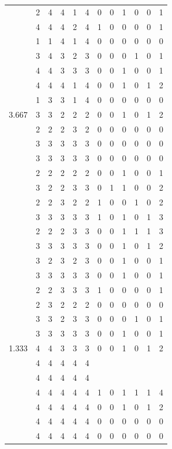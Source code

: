 \documentclass[]{msu-thesis}
\theoremstyle{definition}
\theoremstyle{definition}
\theoremstyle{definition}
\theoremstyle{remark}
\begin{document}
\begin{table}
{\begin{tabular}[t]{rrrrrrrrrrrr}
 & 2 & 4 & 4 & 1 & 4 & 0 & 0 & 1 & 0 & 0 & 1\\
 & 4 & 4 & 4 & 2 & 4 & 1 & 0 & 0 & 0 & 0 & 1\\
 & 1 & 1 & 4 & 1 & 4 & 0 & 0 & 0 & 0 & 0 & 0\\
 & 3 & 4 & 3 & 2 & 3 & 0 & 0 & 0 & 1 & 0 & 1\\
 & 4 & 4 & 3 & 3 & 3 & 0 & 0 & 1 & 0 & 0 & 1\\
 & 4 & 4 & 4 & 1 & 4 & 0 & 0 & 1 & 0 & 1 & 2\\
 & 1 & 3 & 3 & 1 & 4 & 0 & 0 & 0 & 0 & 0 & 0\\
3.667 & 3 & 3 & 2 & 2 & 2 & 0 & 0 & 1 & 0 & 1 & 2\\
 & 2 & 2 & 2 & 3 & 2 & 0 & 0 & 0 & 0 & 0 & 0\\
 & 3 & 3 & 3 & 3 & 3 & 0 & 0 & 0 & 0 & 0 & 0\\
 & 3 & 3 & 3 & 3 & 3 & 0 & 0 & 0 & 0 & 0 & 0\\
 & 2 & 2 & 2 & 2 & 2 & 0 & 0 & 1 & 0 & 0 & 1\\
 & 3 & 2 & 2 & 3 & 3 & 0 & 1 & 1 & 0 & 0 & 2\\
 & 2 & 2 & 3 & 2 & 2 & 1 & 0 & 0 & 1 & 0 & 2\\
 & 3 & 3 & 3 & 3 & 3 & 1 & 0 & 1 & 0 & 1 & 3\\
 & 2 & 2 & 2 & 3 & 3 & 0 & 0 & 1 & 1 & 1 & 3\\
 & 3 & 3 & 3 & 3 & 3 & 0 & 0 & 1 & 0 & 1 & 2\\
 & 3 & 2 & 3 & 2 & 3 & 0 & 0 & 1 & 0 & 0 & 1\\
 & 3 & 3 & 3 & 3 & 3 & 0 & 0 & 1 & 0 & 0 & 1\\
 & 2 & 2 & 3 & 3 & 3 & 1 & 0 & 0 & 0 & 0 & 1\\
 & 2 & 3 & 2 & 2 & 2 & 0 & 0 & 0 & 0 & 0 & 0\\
 & 3 & 3 & 2 & 3 & 3 & 0 & 0 & 0 & 1 & 0 & 1\\
 & 3 & 3 & 3 & 3 & 3 & 0 & 0 & 1 & 0 & 0 & 1\\
1.333 & 4 & 4 & 3 & 3 & 3 & 0 & 0 & 1 & 0 & 1 & 2\\
 & 4 & 4 & 4 & 4 & 4 &  &  &  &  &  & \\
 & 4 & 4 & 4 & 4 & 4 &  &  &  &  &  & \\
 & 4 & 4 & 4 & 4 & 4 & 1 & 0 & 1 & 1 & 1 & 4\\
 & 4 & 4 & 4 & 4 & 4 & 0 & 0 & 1 & 0 & 1 & 2\\
 & 4 & 4 & 4 & 4 & 4 & 0 & 0 & 0 & 0 & 0 & 0\\
 & 4 & 4 & 4 & 4 & 4 & 0 & 0 & 0 & 0 & 0 & 0\\

\end{tabular}}
\end{table}
\end{document}
